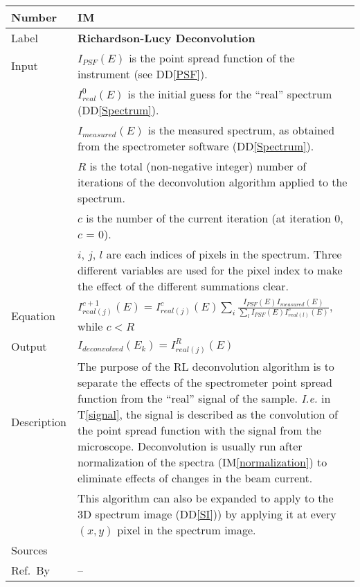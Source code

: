 \documentclass[12pt]{article}
\newcommand{\colAwidth}{0.13\textwidth}
\newcommand{\colBwidth}{0.82\textwidth}
\newcommand{\ddref}[1]{DD\ref{#1}}
\newcommand{\tref}[1]{T\ref{#1}}
\newcounter{instnum} %
\newcommand{\iref}[1]{IM\ref{#1}}
\begin{document}
~\newline


\noindent
\begin{minipage}{\textwidth}
	\renewcommand*{\arraystretch}{1.5}
	\begin{tabular}{| p{\colAwidth} | p{\colBwidth}|}
		\hline
		\rowcolor[gray]{0.9}
		Number & IM{instnum}\theinstnum \label{deconvolution}\\
		\hline
		Label & \bf Richardson-Lucy Deconvolution\\
		\hline
		Input& $I_{PSF}(E)$ is the point spread function of the instrument (see \ddref{PSF}).\\
		& $I_{real}^0(E)$ is the initial guess for the ``real'' spectrum (\ddref{Spectrum}).\\
		& $I_{measured}(E)$ is the measured spectrum, as obtained from the spectrometer software (\ddref{Spectrum}).\\
		& $R$ is the total (non-negative integer) number of iterations of the deconvolution algorithm applied to the spectrum. \\
		& $c$ is the number of the current iteration (at iteration 0, $c$ = 0).\\
		& $i$, $j$, $l$ are each indices of pixels in the spectrum. Three different variables are used for the pixel index to make the effect of the different summations clear.\\
		\hline
		Equation & $I_{real (j)}^{c+1}(E)=I_{real (j)}^c(E)\sum_i{\frac{I_{PSF}(E)I_{measured}(E)}{\sum_l{I_{PSF}(E)I_{real (l)}^c(E)}}}$, while $c < R$\\
		\hline
		Output& $I_{deconvolved}(E_k)=I_{real (j)}^{R}(E)$\\
		\hline
		Description & The purpose of the RL deconvolution algorithm is to separate the effects of the spectrometer point spread function from the ``real'' signal of the sample. \textit{I.e.} in \tref{signal}, the signal is described as the convolution of the point spread function with the signal from the microscope. Deconvolution is usually run after normalization of the spectra (\iref{normalization}) to eliminate effects of changes in the beam current.\\
		& This algorithm can also  be expanded to apply to the 3D spectrum image (\ddref{SI})) by applying it at every $(x,y)$ pixel in the spectrum image.\\
		\hline
		Sources&~\cite{gloter_improving_2003, bellido_toward_2014} \ \\
		\hline
		Ref.\ By & --\\
		\hline
	\end{tabular}
\end{minipage}\\
\end{document}
